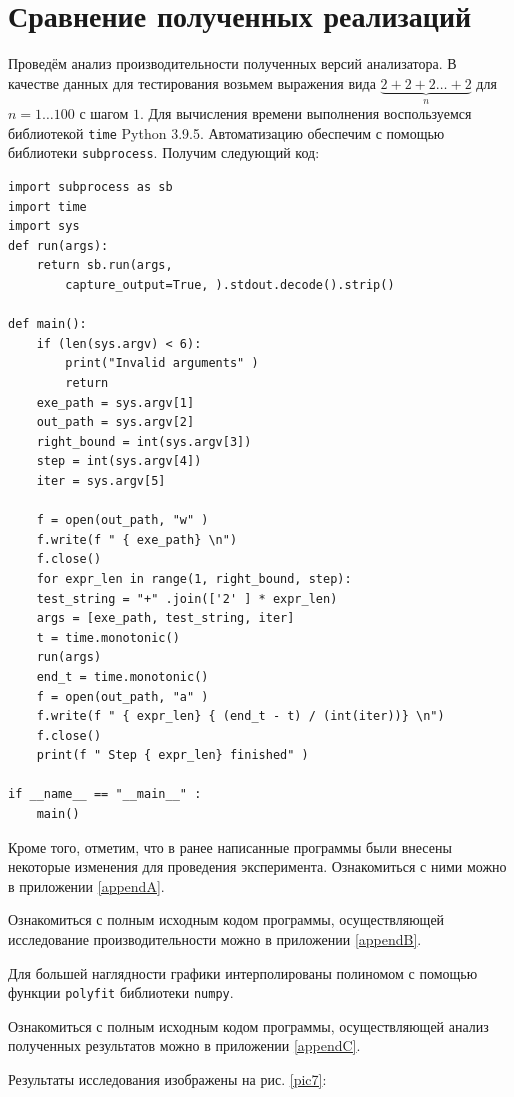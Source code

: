 \documentclass[coursework]{SCWorks}
\begin{document}
\section{Сравнение полученных реализаций}

Проведём анализ производительности полученных версий анализатора. В качестве данных для тестирования возьмем выражения вида
$ \underbrace{2 + 2 + 2 \ldots + 2}_{n}$ для $ n = 1 \ldots 100$ с шагом $1$. Для вычисления времени выполнения воспользуемся библиотекой \texttt{time} Python 3.9.5. Автоматизацию обеспечим с помощью библиотеки \texttt{subprocess}. Получим следующий код:

\begin{verbatim}
import subprocess as sb
import time
import sys
def run(args):
    return sb.run(args,
        capture_output=True, ).stdout.decode().strip()
        
def main():
    if (len(sys.argv) < 6):
        print("Invalid arguments" )
        return
    exe_path = sys.argv[1]
    out_path = sys.argv[2]
    right_bound = int(sys.argv[3])
    step = int(sys.argv[4])
    iter = sys.argv[5]
    
    f = open(out_path, "w" )
    f.write(f " { exe_path} \n")
    f.close()
    for expr_len in range(1, right_bound, step):
	test_string = "+" .join(['2' ] * expr_len)
	args = [exe_path, test_string, iter]
	t = time.monotonic()
	run(args)
	end_t = time.monotonic()
	f = open(out_path, "a" )
	f.write(f " { expr_len} { (end_t - t) / (int(iter))} \n")
	f.close()
	print(f " Step { expr_len} finished" )

if __name__ == "__main__" :
    main()
\end{verbatim}

Кроме того, отметим, что в ранее написанные программы были внесены некоторые изменения для проведения эксперимента. Ознакомиться с ними можно в приложении \ref{appendA}.

Ознакомиться с полным исходным кодом программы, осуществляющей исследование производительности можно в приложении \ref{appendB}.

Для большей наглядности графики интерполированы полиномом с помощью функции \texttt{polyfit} библиотеки \texttt{numpy}.

Ознакомиться с полным исходным кодом программы, осуществляющей анализ полученных результатов можно в приложении \ref{appendC}.

Результаты исследования изображены на рис. \ref{pic7}:
\end{document}
